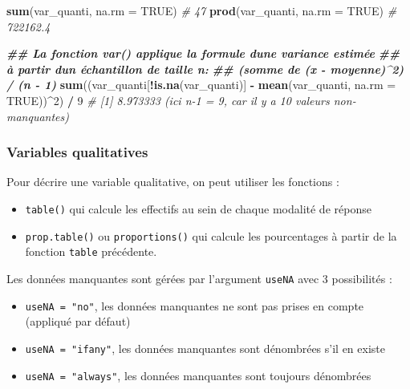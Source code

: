 \documentclass[
]{book}
\newenvironment{Shaded}{\begin{snugshade}}{\end{snugshade}}
\newcommand{\AttributeTok}[1]{\textcolor[rgb]{0.13,0.29,0.53}{#1}}
\newcommand{\CommentTok}[1]{\textcolor[rgb]{0.56,0.35,0.01}{\textit{#1}}}
\newcommand{\ConstantTok}[1]{\textcolor[rgb]{0.56,0.35,0.01}{#1}}
\newcommand{\DecValTok}[1]{\textcolor[rgb]{0.00,0.00,0.81}{#1}}
\newcommand{\DocumentationTok}[1]{\textcolor[rgb]{0.56,0.35,0.01}{\textbf{\textit{#1}}}}
\newcommand{\FunctionTok}[1]{\textcolor[rgb]{0.13,0.29,0.53}{\textbf{#1}}}
\newcommand{\NormalTok}[1]{#1}
\newcommand{\SpecialCharTok}[1]{\textcolor[rgb]{0.81,0.36,0.00}{\textbf{#1}}}
\providecommand{\tightlist}{%
  \setlength{\itemsep}{0pt}\setlength{\parskip}{0pt}}
\begin{document}
\begin{Shaded}
\begin{Highlighting}[]
\FunctionTok{sum}\NormalTok{(var\_quanti, }\AttributeTok{na.rm =} \ConstantTok{TRUE}\NormalTok{) }\CommentTok{\# 47}
\FunctionTok{prod}\NormalTok{(var\_quanti, }\AttributeTok{na.rm =} \ConstantTok{TRUE}\NormalTok{) }\CommentTok{\# 722162.4}

\DocumentationTok{\#\# La fonction var() applique la formule d\textquotesingle{}une variance estimée}
\DocumentationTok{\#\# à partir d\textquotesingle{}un échantillon de taille n: }
\DocumentationTok{\#\# (somme de (x {-} moyenne)\^{}2) / (n {-} 1)}
\FunctionTok{sum}\NormalTok{((var\_quanti[}\SpecialCharTok{!}\FunctionTok{is.na}\NormalTok{(var\_quanti)] }\SpecialCharTok{{-}} \FunctionTok{mean}\NormalTok{(var\_quanti, }\AttributeTok{na.rm =} \ConstantTok{TRUE}\NormalTok{))}\SpecialCharTok{\^{}}\DecValTok{2}\NormalTok{) }\SpecialCharTok{/} \DecValTok{9}
\CommentTok{\# [1] 8.973333 (ici n{-}1 = 9, car il y a 10 valeurs non{-}manquantes)}
\end{Highlighting}
\end{Shaded}

\subsubsection{Variables qualitatives}\label{variables-qualitatives}

Pour décrire une variable qualitative, on peut utiliser les fonctions :

\begin{itemize}
\tightlist
\item
  \texttt{table()} qui calcule les effectifs au sein de chaque modalité de réponse
\item
  \texttt{prop.table()} ou \texttt{proportions()} qui calcule les pourcentages à partir de la fonction \texttt{table} précédente.
\end{itemize}

Les données manquantes sont gérées par l'argument \texttt{useNA} avec 3 possibilités :

\begin{itemize}
\tightlist
\item
  \texttt{useNA\ =\ "no"}, les données manquantes ne sont pas prises en compte (appliqué par défaut)
\item
  \texttt{useNA\ =\ "ifany"}, les données manquantes sont dénombrées s'il en existe
\item
  \texttt{useNA\ =\ "always"}, les données manquantes sont toujours dénombrées
\end{itemize}
\end{document}
